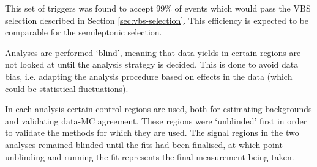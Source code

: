 This set of triggers was found to accept 99\% of events which would pass the
\acs{VBS} \Zy selection described in Section \ref{sec:vbs-selection}. This
efficiency is expected to be comparable for the semileptonic \VZy selection.

Analyses are performed `blind', meaning that data yields in certain regions are
not looked at until the analysis strategy is decided. This is done to avoid data
bias, i.e. adapting the analysis procedure based on effects in the data (which
could be statistical fluctuations).

In each analysis certain control regions are used, both for estimating
backgrounds and validating data-\ac{MC} agreement. These regions were `unblinded'
first in order to validate the methods for which they are used. The signal
regions in the two analyses remained blinded until the fits had been finalised,
at which point unblinding and running the fit represents the final measurement
being taken.
